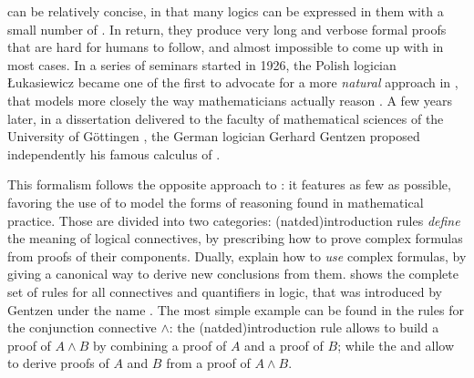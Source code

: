 \AP
{} can be relatively concise, in that many logics can be
expressed in them with a small number of . In return, they produce very
long and verbose formal proofs that are hard for humans to follow, and almost
impossible to come up with in most cases. In a series of seminars started in
1926, the Polish logician Łukasiewicz became one of the first to advocate for a
more \emph{natural} approach in , that models more closely the way
mathematicians actually reason . A few years
later, in a dissertation delivered to the faculty of mathematical sciences of
the University of Göttingen , the German
logician Gerhard Gentzen proposed independently his famous calculus of
.

\AP
This formalism follows the opposite approach to : it
features as few  as possible, favoring the use of \emph{} to model the forms of reasoning found in mathematical practice. Those
are divided into two categories: \intro(natded){introduction rules}
\emph{define} the meaning of logical connectives, by prescribing how to prove
complex formulas from proofs of their components. Dually,  explain how to \emph{use} complex formulas, by giving a canonical way to
derive new conclusions from them.  shows the complete set of
 rules for all connectives and quantifiers in
 logic, that was introduced by Gentzen under the name
\cite{gentzen_untersuchungen_1935}. The most simple example can be found in the
rules for the conjunction connective $\land$: the \kl(natded){introduction rule}
 allows to build a proof of $A \land B$ by combining a proof of $A$
and a proof of $B$; while the   and
 allow to derive proofs of $A$ and $B$ from a proof of $A \land
B$.

